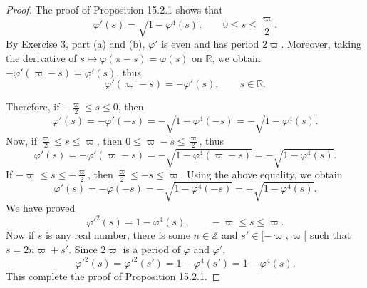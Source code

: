 \documentclass[11pt,a4paper]{article}
\newcommand{\Z}{\mathbb{Z}}
\newcommand{\R}{\mathbb{R}}
\begin{document}
\begin{proof}
The proof of Proposition 15.2.1 shows that
$$\varphi'(s)  = \sqrt{1 - \varphi^4(s)},\qquad 0 \leq s \leq \frac{\varpi}{2}.$$
By Exercise 3, part (a) and (b), $\varphi'$ is even and has period $2 \varpi$. 
Moreover, taking the derivative of $s \mapsto \varphi(\pi - s) = \varphi(s)$ on $\R$, we obtain $-\varphi'(\varpi - s) = \varphi'(s)$, thus
$$\varphi'(\varpi - s) = - \varphi'(s), \qquad s \in \R.$$

Therefore, if $-\frac{\varpi}{2} \leq s \leq 0$, then
$$\varphi'(s) = - \varphi'(-s) =  -\sqrt{1 - \varphi^4(-s)} = - \sqrt{1 - \varphi^4(s)}.$$
Now, if $\frac{\varpi}{2} \leq s \leq \varpi$, then $0 \leq \varpi -s \leq \frac{\varpi}{2}$, thus 
$$\varphi'(s) = -\varphi'(\varpi - s) = -\sqrt{1 - \varphi^4(\varpi - s)} = - \sqrt{1 - \varphi^4(s)}.$$
If $-\varpi \leq s \leq -\frac{\varpi}{2}$, then $\frac{\varpi}{2} \leq -s  \leq \varpi$. Using the above equality, we obtain
$$\varphi'(s) = - \varphi(-s) = -  \sqrt{1 - \varphi^4(-s)} = - \sqrt{1 - \varphi^4(s)}.$$
We have proved
$$\varphi'^2(s) = 1 - \varphi^4(s), \qquad -\varpi \leq s \leq \varpi. $$
Now if $s$ is any real number, there is some $n\in \Z$ and $s' \in [-\varpi, \varpi[$ such that $s = 2n \varpi + s'$. Since $2\varpi$ is a period of $\varphi$ and $\varphi'$,
$$\varphi'^2(s) = \varphi'^2(s') = 1 -\varphi^4(s') = 1 - \varphi^4(s).$$
This complete the proof of Proposition 15.2.1.
\end{proof}
\end{document}
